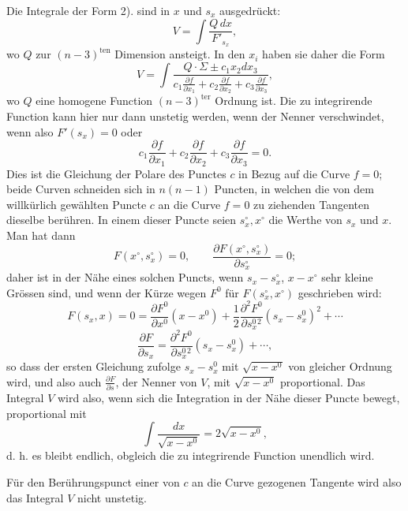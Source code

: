 \documentclass[10pt]{article}
\begin{document}
Die Integrale der Form 2). sind in $x$ und $s_x$ ausgedrückt:
\[
V=\int\frac{Q\,dx}{F'_{s_x}},
\]
wo $Q$ zur $(n-3)^{\mathrm{ten}}$ Dimension ansteigt. In den $x_i$ haben sie daher die Form
\[
V=\int\frac{Q\cdot\Sigma\pm c_1x_2dx_3}{c_1\frac{\partial f}{\partial x_1}+c_2\frac{\partial f}{\partial x_2}+c_3\frac{\partial f}{\partial x_3}},
\]
wo $Q$ eine homogene Function $(n-3)^{\mathrm{ter}}$ Ordnung ist. Die zu integrirende Function kann hier nur dann unstetig werden, wenn der Nenner verschwindet, wenn also $F'(s_x)=0$ oder
\[
c_1\frac{\partial f}{\partial x_1}+c_2\frac{\partial f}{\partial x_2}+c_3\frac{\partial f}{\partial x_3}=0.
\]
Dies ist die Gleichung der Polare des Punctes $c$ in Bezug auf die Curve $f=0$; beide Curven schneiden sich in $n(n-1)$ Puncten, in welchen die von dem willkürlich gewählten Puncte $c$ an die Curve $f=0$ zu ziehenden Tangenten dieselbe berühren. In einem dieser Puncte seien $s_x^\circ,x^\circ$ die Werthe von $s_x$ und $x$. Man hat dann
\[
F(x^\circ,s_x^\circ)=0,\qquad \frac{\partial F(x^\circ,s_x^\circ)}{\partial s_x^\circ}=0;
\]
daher ist in der Nähe eines solchen Puncts, wenn $s_x-s_x^\circ$, $x-x^\circ$ sehr kleine Grössen sind, und wenn der Kürze wegen $F^0$ für $F(s_x^\circ,x^\circ)$ geschrieben wird:
\[
F(s_x,x)=0=\frac{\partial F^0}{\partial x^0}(x-x^0)+\frac12\frac{\partial^2F^0}{\partial s_x^{0\,2}}(s_x-s_x^0)^2+\cdots
\]
\[
\frac{\partial F}{\partial s_x}=\frac{\partial^2F^0}{\partial s_x^{0\,2}}(s_x-s_x^0)+\cdots,
\]
so dass der ersten Gleichung zufolge $s_x-s_x^0$ mit $\sqrt{x-x^0}$ von gleicher Ordnung wird, und also auch $\frac{\partial F}{\partial s}$, der Nenner von $V$, mit $\sqrt{x-x^0}$ proportional. Das Integral $V$ wird also, wenn sich die Integration in der Nähe dieser Puncte bewegt, proportional mit
\[
\int\frac{dx}{\sqrt{x-x^0}}=2\sqrt{x-x^0},
\]
d. h. es bleibt endlich, obgleich die zu integrirende Function unendlich wird.

Für den Berührungspunct einer von $c$ an die Curve gezogenen Tangente wird also das Integral $V$ nicht unstetig.
\end{document}
